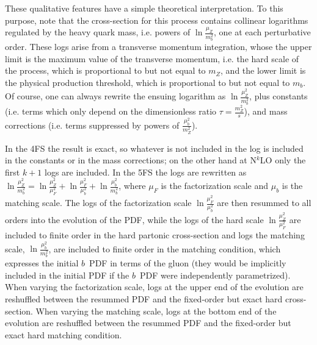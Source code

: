 \documentclass[12pt]{article}
\begin{document}
These qualitative features have a simple theoretical
interpretation. To this purpose, note that the cross-section for
this process contains collinear logarithms regulated by the heavy
quark mass, i.e. powers of $\ln\frac{\mu_Z}{m_b^2}$, one at each
perturbative order. These logs  
arise from a transverse
momentum integration, whose the upper limit is the maximum value of the
transverse momentum, i.e. the hard scale of the process, 
which is proportional to but not equal to $m_Z$, and the lower limit
is the physical production threshold, which is proportional to but not
equal to $m_b$. Of course, one can always rewrite the ensuing
logarithm as  $\ln\frac{\mu_Z^2}{m_b^2}$, plus constants (i.e. terms
which only depend on the dimensionless ratio $\tau=\frac{m_Z^2}{s}$),
and mass corrections (i.e. terms suppressed by powers of
$\frac{\mu^2_b}{m_Z^2}$). 

In the 4FS the result is exact, so whatever is not included in the log is included in
the constants or in the mass corrections; on the other hand at
N$^{k}$LO only the first $k+1$ logs are included. In the 5FS the logs are
rewritten as
$\ln\frac{\mu_Z^2}{m_b^2}=\ln\frac{\mu_Z^2}{\mu_F^2}+\ln\frac{\mu_F^2}{\mu_b^2}+\ln\frac{\mu_b^2}{m_b^2}
$, where $\mu_F$ is the factorization  scale and 
$\mu_b$ is the matching scale. The logs of the factorization scale 
$\ln\frac{\mu_F^2}{\mu_b^2}$ are then resummed to all orders into
the evolution of the PDF, while
the logs of the hard scale $\ln\frac{\mu_Z^2}{\mu_F^2}$ are included to
finite order in the hard partonic cross-section and
logs the matching scale, $\ln\frac{\mu_b^2}{m_b^2}$, are 
included to finite order in the matching condition, which
expresses the initial $b$~PDF in terms of the gluon (they would be 
implicitly included in the initial PDF
if the $b$~PDF were independently parametrized).
When varying the factorization scale, logs at the upper end
of the evolution are reshuffled between the resummed PDF and the
fixed-order but exact hard cross-section. When varying the matching
scale, logs at the bottom end 
of the evolution are reshuffled between the resummed PDF and the
fixed-order but exact hard matching condition.
\end{document}
